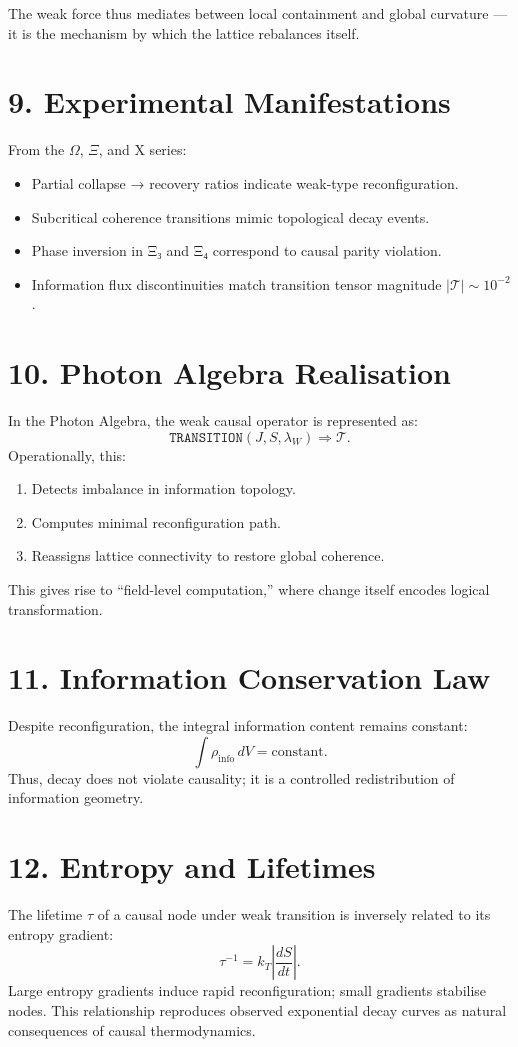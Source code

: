 \documentclass[11pt,a4paper]{article}
\begin{document}
The weak force thus mediates between local containment and global curvature — it is the mechanism by which the lattice rebalances itself.

\section{9. Experimental Manifestations}
From the $\Omega$, $\Xi$, and X series:
\begin{itemize}
\item Partial collapse → recovery ratios indicate weak-type reconfiguration.  
\item Subcritical coherence transitions mimic topological decay events.  
\item Phase inversion in Ξ₃ and Ξ₄ correspond to causal parity violation.  
\item Information flux discontinuities match transition tensor magnitude $|\mathcal{T}| \sim 10^{-2}$.
\end{itemize}

\section{10. Photon Algebra Realisation}
In the Photon Algebra, the weak causal operator is represented as:
\[
\texttt{TRANSITION}(J, S, \lambda_W) \Rightarrow \mathcal{T}.
\]
Operationally, this:
\begin{enumerate}
\item Detects imbalance in information topology.
\item Computes minimal reconfiguration path.
\item Reassigns lattice connectivity to restore global coherence.
\end{enumerate}
This gives rise to ``field-level computation,'' where change itself encodes logical transformation.

\section{11. Information Conservation Law}
Despite reconfiguration, the integral information content remains constant:
\[
\int \rho_{\mathrm{info}}\, dV = \text{constant}.
\]
Thus, decay does not violate causality; it is a controlled redistribution of information geometry.

\section{12. Entropy and Lifetimes}
The lifetime $\tau$ of a causal node under weak transition is inversely related to its entropy gradient:
\[
\tau^{-1} = k_T \left|\frac{dS}{dt}\right|.
\]
Large entropy gradients induce rapid reconfiguration; small gradients stabilise nodes.  
This relationship reproduces observed exponential decay curves as natural consequences of causal thermodynamics.
\end{document}

